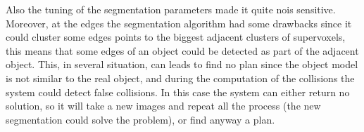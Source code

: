  Also the tuning of the segmentation parameters made it quite nois sensitive. Moreover, at the edges the segmentation algorithm had some drawbacks since it could cluster some edges points to the biggest adjacent clusters of supervoxels, this means that some edges of an object could be detected as part of the adjacent object. This, in several situation, can leads to find no plan since the object model is not similar to the real object, and during the computation of the collisions the system could detect false collisions. In this case the system can either return no solution, so it will take a new images and repeat all the process (the new segmentation could solve the problem), or find anyway a plan.  





